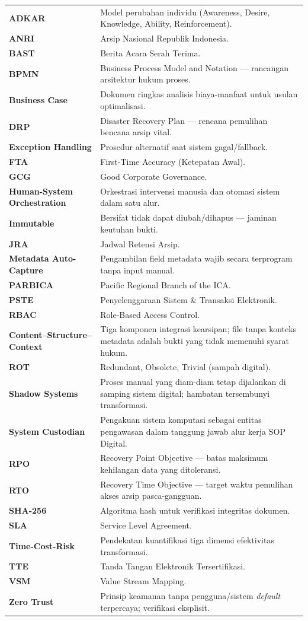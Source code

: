 \documentclass[12pt,a4paper]{report}
\begin{document}
\begin{xltabular}{\textwidth}{@{} >{\bfseries}l X @{}}
ADKAR & Model perubahan individu (Awareness, Desire, Knowledge, Ability, Reinforcement). \\
ANRI & Arsip Nasional Republik Indonesia. \\
BAST & Berita Acara Serah Terima. \\
BPMN & Business Process Model and Notation --- rancangan arsitektur hukum proses. \\
Business Case & Dokumen ringkas analisis biaya-manfaat untuk usulan optimalisasi. \\
DRP & Disaster Recovery Plan --- rencana pemulihan bencana arsip vital. \\
Exception Handling & Prosedur alternatif saat sistem gagal/fallback. \\
FTA & First-Time Accuracy (Ketepatan Awal). \\
GCG & Good Corporate Governance. \\
Human-System Orchestration & Orkestrasi intervensi manusia dan otomasi sistem dalam satu alur. \\
Immutable & Bersifat tidak dapat diubah/dihapus --- jaminan keutuhan bukti. \\
JRA & Jadwal Retensi Arsip. \\
Metadata Auto-Capture & Pengambilan field metadata wajib secara terprogram tanpa input manual. \\
PARBICA & Pacific Regional Branch of the ICA. \\
PSTE & Penyelenggaraan Sistem \& Transaksi Elektronik. \\
RBAC & Role-Based Access Control. \\
Content--Structure--Context & Tiga komponen integrasi kearsipan; file tanpa konteks metadata adalah bukti yang tidak memenuhi syarat hukum. \\
ROT & Redundant, Obsolete, Trivial (sampah digital). \\
Shadow Systems & Proses manual yang diam-diam tetap dijalankan di samping sistem digital; hambatan tersembunyi transformasi. \\
System Custodian & Pengakuan sistem komputasi sebagai entitas pengawasan dalam tanggung jawab alur kerja SOP Digital. \\
RPO & Recovery Point Objective --- batas maksimum kehilangan data yang ditoleransi. \\
RTO & Recovery Time Objective --- target waktu pemulihan akses arsip pasca-gangguan. \\
SHA-256 & Algoritma hash untuk verifikasi integritas dokumen. \\
SLA & Service Level Agreement. \\
Time-Cost-Risk & Pendekatan kuantifikasi tiga dimensi efektivitas transformasi. \\
TTE & Tanda Tangan Elektronik Tersertifikasi. \\
VSM & Value Stream Mapping. \\
Zero Trust & Prinsip keamanan tanpa pengguna/sistem \textit{default} terpercaya; verifikasi eksplisit. \\
\bottomrule
\end{xltabular}
\endgroup
\end{document}

